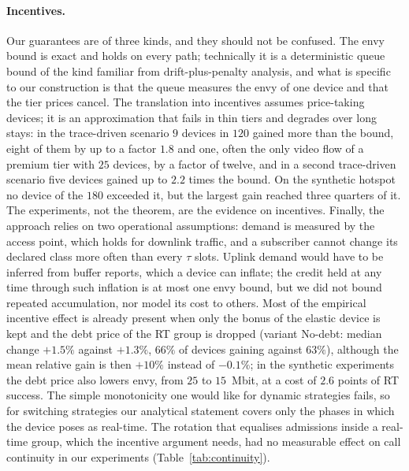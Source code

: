 \paragraph{Incentives.}
Our guarantees are of three kinds, and they should not be confused.
The envy bound is exact and holds on every path; technically it is a deterministic queue bound of the kind familiar from drift-plus-penalty analysis, and what is specific to our construction is that the queue measures the envy of one device and that the tier prices cancel.
The translation into incentives assumes price-taking devices; it is an approximation that fails in thin tiers and degrades over long stays: in the trace-driven scenario $9$ devices in $120$ gained more than the bound, eight of them by up to a factor $1.8$ and one, often the only video flow of a premium tier with $25$ devices, by a factor of twelve, and in a second trace-driven scenario five devices gained up to $2.2$ times the bound. On the synthetic hotspot no device of the $180$ exceeded it, but the largest gain reached three quarters of it. The experiments, not the theorem, are the evidence on incentives.
Finally, the approach relies on two operational assumptions: demand is measured by the access point, which holds for downlink traffic, and a subscriber cannot change its declared class more often than every $\tau$ slots.
Uplink demand would have to be inferred from buffer reports, which a device can inflate; the credit held at any time through such inflation is at most one envy bound, but we did not bound repeated accumulation, nor model its cost to others.
Most of the empirical incentive effect is already present when only the bonus of the elastic device is kept and the debt price of the RT group is dropped (variant No-debt: median change $+1.5\%$ against $+1.3\%$, $66\%$ of devices gaining against $63\%$), although the mean relative gain is then $+10\%$ instead of $-0.1\%$; in the synthetic experiments the debt price also lowers envy, from $25$ to $15$~Mbit, at a cost of $2.6$ points of RT success.
The simple monotonicity one would like for dynamic strategies fails, so for switching strategies our analytical statement covers only the phases in which the device poses as real-time.
The rotation that equalises admissions inside a real-time group, which the incentive argument needs, had no measurable effect on call continuity in our experiments (Table~\ref{tab:continuity}).

